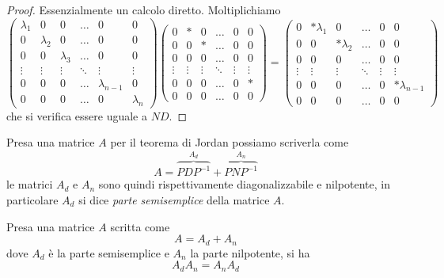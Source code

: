 \documentclass[11pt]{scrartcl}
\begin{document}
   	 \begin{proof}
   	 	Essenzialmente un calcolo diretto. Moltiplichiamo
   	 	$$
   	 	\begin{pmatrix}
   	 		\lambda_1 & 0 & 0 & \dots &0 & 0 \\
   	 		0 & \lambda_2 & 0 & \dots &0 & 0 \\
   	 		0 & 0 & \lambda_3 & \dots &0 & 0 \\
   	 		\vdots & \vdots & \vdots & \ddots & \vdots & \vdots \\
   	 		0 & 0 & 0 & \dots & \lambda_{n-1} & 0 \\
   	 		0 & 0 & 0 & \dots & 0 & \lambda_n
   	 	\end{pmatrix}
   	 	\begin{pmatrix}
   	 		0 & * & 0 & \dots &0 & 0 \\
   	 		0 & 0 & * & \dots &0 & 0 \\
   	 		0 & 0 & 0 & \dots &0 & 0 \\
   	 		\vdots & \vdots & \vdots & \ddots & \vdots & \vdots \\
   	 		0 & 0 & 0 & \dots & 0 & * \\
   	 		0 & 0 & 0 & \dots & 0 & 0
   	 	\end{pmatrix}
   	 	=
   	 	\begin{pmatrix}
   	 		0 & *\lambda_1 & 0 & \dots &0 & 0 \\
   	 		0 & 0 & *\lambda_2 & \dots &0 & 0 \\
   	 		0 & 0 & 0 & \dots &0 & 0 \\
   	 		\vdots & \vdots & \vdots & \ddots & \vdots & \vdots \\
   	 		0 & 0 & 0 & \dots & 0 & *\lambda_{n-1} \\
   	 		0 & 0 & 0 & \dots & 0 & 0
   	 	\end{pmatrix}
   	 	$$
   	 	che si verifica essere uguale a $ND$.
   	 \end{proof}
   	 \begin{definition}
   	 	Presa una matrice $A$ per il teorema di Jordan possiamo scriverla come
   	 	$$A=\overset{A_d}{\overbrace{PDP^{-1}}}+\overset{A_n}{\overbrace{PNP^{-1}}}$$
   	 	le matrici $A_d$ e $A_n$ sono quindi rispettivamente diagonalizzabile e nilpotente, in particolare $A_d$ si dice \textit{parte semisemplice} della matrice $A$.
   	 \end{definition}
   	 \begin{corollary}
   	 	Presa una matrice $A$ scritta come
   	 	$$A=A_d+A_n$$
   	 	dove $A_d$ è la parte semisemplice e $A_n$ la parte nilpotente, si ha
   	 	$$A_dA_n=A_nA_d$$
   	 \end{corollary}
\end{document}
